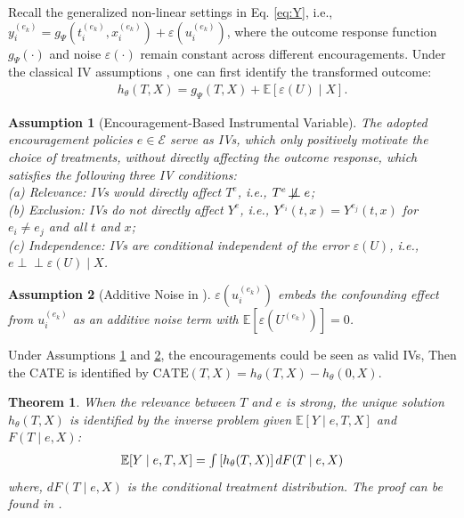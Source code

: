 \documentclass[journal]{IEEEtran}
\newtheorem{theorem}{Theorem}
\newtheorem{assumption}{Assumption}
\newcommand*{\Scale}[2][4]{\scalebox{#1}{$#2$}}
\newcommand{\indep}{\perp \!\!\! \perp}
\newcommand{\notindep}{\not \! \perp \!\!\! \perp}
\begin{document}
Recall the generalized non-linear settings in Eq. \eqref{eq:Y}, i.e., $y_i^{(e_k)} = g_{\Psi}( t_i^{(e_k)}, x_i^{(e_k)}) + \varepsilon( u_i^{(e_k)} )$,
where the outcome response function $g_{\Psi}(\cdot)$ and noise $\varepsilon( \cdot )$ remain constant across different encouragements. Under the classical IV assumptions \cite{newey2003instrumental,hartford2017deep}, 
one can first identify the transformed outcome: 
\begin{eqnarray}
    h_{\theta}( T, X) = g_{\Psi}( T, X) + \mathbb{E}[\varepsilon( U ) \mid X].
    \label{eq:counterfacutal}
\end{eqnarray}

\begin{assumption}[Encouragement-Based Instrumental Variable] \label{ass:encourage}
    The adopted encouragement policies $e \in \mathcal{E}$ serve as IVs, which only positively motivate the choice of treatments, without directly affecting the outcome response, which satisfies the following three IV conditions: \\
(a) \emph{Relevance}: IVs would directly affect $T^{e}$, i.e., $T^{e} \notindep e $; \\
(b) \emph{Exclusion}: IVs do not directly affect $Y^{e}$, i.e., $Y^{e_i}(t, x) = Y^{e_j}(t, x)$ for $e_i \not = e_j$ and all $t$ and $x$; \\
(c) \emph{Independence}: IVs are conditional independent of the error $\varepsilon(U)$, i.e., $e \indep \varepsilon(U) \mid X$.
\end{assumption}

\begin{assumption}[Additive Noise in \cite{hartford2017deep}] \label{ass:additive}
$\varepsilon( u_i^{(e_k)})$ embeds the confounding effect from $u_i^{(e_k)}$ as an additive noise term with  $\mathbb{E}[\varepsilon( U^{(e_k)})]=0$.
\end{assumption}

Under Assumptions \ref{ass:encourage} and \ref{ass:additive}, the encouragements could be seen as valid IVs, Then the CATE is identified by $\text{CATE}(T,X) = h_{\theta}( T, X) - h_{\theta}(0, X)$.

\begin{theorem} \label{theorem:3}
    When the relevance between $T$ and $e$ is strong, the unique solution ${ h }_{\theta}(T,X)$ is identified by the inverse problem given $\mathbb{E}[Y \mid e,T,X]$ and $F(T \mid e, X)$:
\begin{eqnarray}
\Scale[1.0]{\mathbb{E}[Y \mid e, T,X]} = \Scale[1.0]{\int \left[ {h}_{\theta}(T,X) \right] dF(T \mid e,X)} 
\end{eqnarray}
where, $dF(T \mid e,X)$ is the conditional treatment distribution. The proof can be found in \cite{newey2003instrumental}.
\end{theorem}
\end{document}
